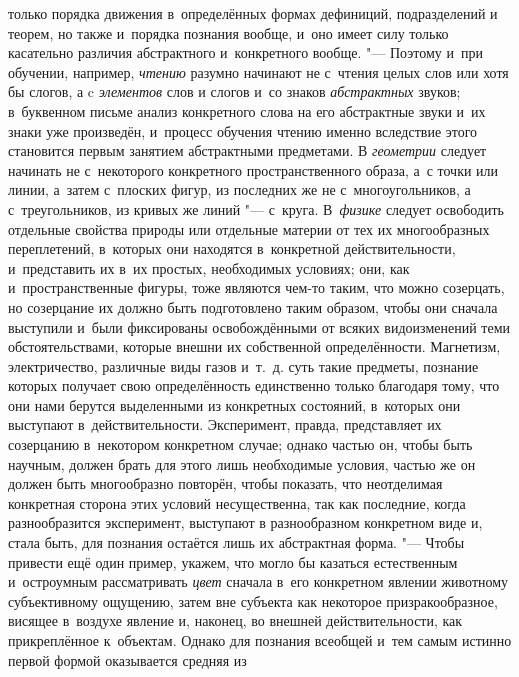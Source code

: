 только порядка движения в~определённых формах дефиниций, подразделений и
теорем, но также и~порядка познания вообще, и~оно имеет силу только
касательно различия абстрактного и~конкретного
вообще.
"--- Поэтому и~при обучении, например,
{\em чтению} разумно
начинают не с~чтения целых слов или хотя бы слогов, а c
{\em элементов} слов и
слогов и~со знаков {\em абстрактных}
звуков; в~буквенном письме анализ конкретного слова на его
абстрактные звуки и~их знаки уже произведён, и~процесс обучения чтению
именно вследствие этого становится первым занятием абстрактными предметами.
В {\em геометрии} следует
начинать не с~некоторого конкретного пространственного образа, а~с точки
или линии, а~затем с~плоских фигур, из последних же не с~многоугольников, а
с~треугольников, из кривых же линий "--- с~круга. В~{\em физике} следует
освободить отдельные свойства природы или отдельные материи от тех их
многообразных переплетений, в~которых они находятся в~конкретной
действительности, и~представить их в~их простых, необходимых условиях; они,
как и~пространственные фигуры, тоже являются чем-то таким, что можно
созерцать, но созерцание их должно быть подготовлено таким образом, чтобы
они сначала выступили и~были фиксированы освобождёнными от всяких
видоизменений теми обстоятельствами, которые внешни их
собственной определённости. Магнетизм, электричество, различные виды газов
и~т.~д. суть такие предметы, познание которых получает свою определённость
единственно только благодаря тому, что они нами берутся выделенными из
конкретных состояний, в~которых они выступают в~действительности.
Эксперимент, правда, представляет их созерцанию в~некотором конкретном
случае; однако частью он, чтобы быть научным, должен брать для этого лишь
необходимые условия, частью же он должен быть многообразно повторён, чтобы
показать, что неотделимая конкретная сторона этих условий несущественна,
так как последние, когда разнообразится эксперимент, выступают в
разнообразном конкретном виде и, стала быть, для познания остаётся лишь их
абстрактная форма. "--- Чтобы привести ещё один пример, укажем,
что могло бы казаться естественным и~остроумным рассматривать
{\em цвет} сначала в~его
конкретном явлении животному субъективному ощущению, затем вне субъекта как
некоторое призракообразное, висящее в~воздухе явление и, наконец, во
внешней действительности, как прикреплённое к~объектам. Однако для познания
всеобщей и~тем самым истинно первой формой оказывается средняя из
